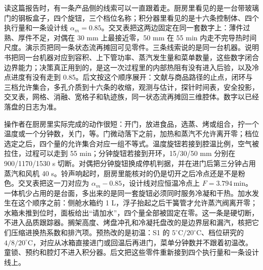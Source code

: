 读这篇报告时，有一条产品侧的线索可以一直跟着走。厨房里看见的是一台带玻璃门的钢板盒子，四个旋钮，三个档位名称；积分器里看见的是十六条控制体、四个执行量和一条设计线 \(\alpha_m=0.85\)。交叉表把这两边固定在同一套数字上：薄件过熟、厚件不足，对偶在 30 mm 上最接近零，50 mm 在 55 min 内走不完导热时间尺度。演示页把同一条状态流再摊回可见零件。三条线索说的是同一台机器。说明书把同一台机器对应到容积、上下管功率、蒸汽发生量和菜单数量，这些数字闭合边界能力；决策真正用到的，是这一次过程里的内部热阻有没有进入后验，以及冷点进度有没有走到 0.85。后文按这个顺序展开：文献与商品路径的止点，闭环与三档允许集合，多孔介质到十六条的收缩，观测与估计，探针时间表，安全投影，交叉表，网格、消融、宽格子和轨迹族，同一状态流再摊回三维腔体。数字以已经落盘的日志为准。

操作者在厨房里实际完成的动作很短：开门，放进食品，选蒸、烤或组合，拧一个温度或一个分钟数，关门，等。门微动落下之前，加热和蒸汽不允许离开零；档位选定之后，四个量的允许集合对应一组不等式。温度旋钮若接到腔温比例，空气被拉住，过程可以走到 55 min；分钟旋钮若接到开环，15/30/50 mm 分别在 900/1170/1530 s 切断。对偶把分钟旋钮换成停机判据，并在进门后第三分钟占用蒸汽和风机 40 s。铃声响起时，厨房里能核对的仍是切开之后冷点还是不是粉色。交叉表把这一刀对应为 \(\alpha_m-0.85\)，设计线对应恒温冷点上 \(F=3.794\,\mathrm{min}\)。一体机少占用的是台面，多出来的是同一套旋钮必须同时服务冷凝和干热。加水发生在这个顺序之前：侧舱水箱约 1 L，浮子抬起之后干簧管才允许蒸汽阀离开零；水箱未推到位时，面板给出“请加水”，四个量全部被固定在零。这一条是硬切断，不进入品质跟踪器。搁架高度、烤盘冲孔和冷凝托盘改的是边界层和漏汽，核把它们压缩进换热系数和排汽项。预热改的是初温：S1 的 \(5^\circ\mathrm{C}/20^\circ\mathrm{C}\)、档位研究的 \(4/8/20^\circ\mathrm{C}\)，对应从冰箱直接进门或回温后再进门，菜单分钟数并不跟着初温改。童锁、预约和腔灯不进入积分器。后文把这些零件重新接到四个执行量和一条设计线上。
